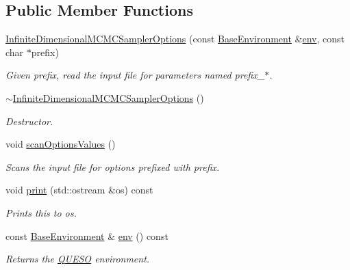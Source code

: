 \subsection*{Public Member Functions}
\begin{DoxyCompactItemize}
\item 
\hyperlink{class_q_u_e_s_o_1_1_infinite_dimensional_m_c_m_c_sampler_options_a75b8f9ff8efcdf810ed966a5e56fdae0}{Infinite\-Dimensional\-M\-C\-M\-C\-Sampler\-Options} (const \hyperlink{class_q_u_e_s_o_1_1_base_environment}{Base\-Environment} \&\hyperlink{class_q_u_e_s_o_1_1_infinite_dimensional_m_c_m_c_sampler_options_aa5828e5c03f12f69edb597cfaf2448ce}{env}, const char $\ast$prefix)
\begin{DoxyCompactList}\small\item\em Given prefix, read the input file for parameters named prefix\-\_\-$\ast$. \end{DoxyCompactList}\item 
\hyperlink{class_q_u_e_s_o_1_1_infinite_dimensional_m_c_m_c_sampler_options_a872f635f05e17901ff245b2c231f8e27}{$\sim$\-Infinite\-Dimensional\-M\-C\-M\-C\-Sampler\-Options} ()
\begin{DoxyCompactList}\small\item\em Destructor. \end{DoxyCompactList}\item 
void \hyperlink{class_q_u_e_s_o_1_1_infinite_dimensional_m_c_m_c_sampler_options_abc90ff7faaa869f71034fafccf35f434}{scan\-Options\-Values} ()
\begin{DoxyCompactList}\small\item\em Scans the input file for options prefixed with {\ttfamily prefix}. \end{DoxyCompactList}\item 
void \hyperlink{class_q_u_e_s_o_1_1_infinite_dimensional_m_c_m_c_sampler_options_adf83c39335cefacc35c33770bd020657}{print} (std\-::ostream \&os) const 
\begin{DoxyCompactList}\small\item\em Prints {\ttfamily this} to {\ttfamily os}. \end{DoxyCompactList}\item 
const \hyperlink{class_q_u_e_s_o_1_1_base_environment}{Base\-Environment} \& \hyperlink{class_q_u_e_s_o_1_1_infinite_dimensional_m_c_m_c_sampler_options_aa5828e5c03f12f69edb597cfaf2448ce}{env} () const 
\begin{DoxyCompactList}\small\item\em Returns the \hyperlink{namespace_q_u_e_s_o}{Q\-U\-E\-S\-O} environment. \end{DoxyCompactList}\end{DoxyCompactItemize}
